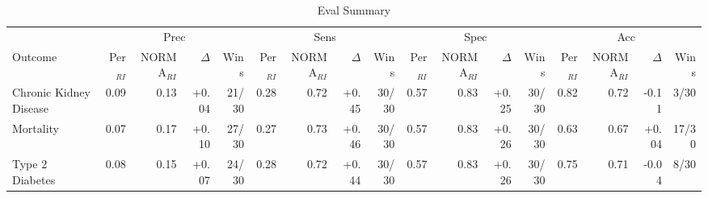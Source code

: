\begin{table}[ht]
\centering
\footnotesize
\begin{tabular}{lrrrrrrrrrrrrrrrr}
\toprule
  & \multicolumn{4}{c}{Prec} & \multicolumn{4}{c}{Sens} & \multicolumn{4}{c}{Spec} & \multicolumn{4}{c}{Acc} \\
\cmidrule(lr){2-5} \cmidrule(lr){6-9} \cmidrule(lr){10-13} \cmidrule(lr){14-17}
Outcome & Per$_{RI}$ & NORMA$_{RI}$ & $\Delta$ & Wins & Per$_{RI}$ & NORMA$_{RI}$ & $\Delta$ & Wins & Per$_{RI}$ & NORMA$_{RI}$ & $\Delta$ & Wins & Per$_{RI}$ & NORMA$_{RI}$ & $\Delta$ & Wins \\
\midrule
Chronic Kidney Disease & 0.09 & 0.13 & +0.04 & 21/30 & 0.28 & 0.72 & +0.45 & 30/30 & 0.57 & 0.83 & +0.25 & 30/30 & 0.82 & 0.72 & -0.11 & 3/30 \\
Mortality & 0.07 & 0.17 & +0.10 & 27/30 & 0.27 & 0.73 & +0.46 & 30/30 & 0.57 & 0.83 & +0.26 & 30/30 & 0.63 & 0.67 & +0.04 & 17/30 \\
Type 2 Diabetes & 0.08 & 0.15 & +0.07 & 24/30 & 0.28 & 0.72 & +0.44 & 30/30 & 0.57 & 0.83 & +0.26 & 30/30 & 0.75 & 0.71 & -0.04 & 8/30 \\
\bottomrule
\end{tabular}
\caption{Eval Summary}
\label{tab:eval_summary}
\end{table}